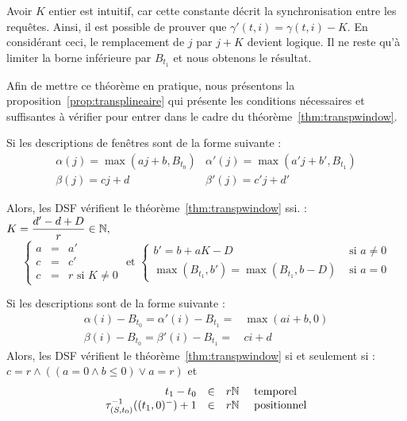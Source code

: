 Avoir $K$ entier est intuitif, car cette constante décrit la synchronisation entre les requêtes. Ainsi, il est possible de prouver que $\gamma'(t,i) = \gamma(t,i) - K$. En considérant ceci, le remplacement de $j$ par $j+K$ devient logique. Il ne reste qu'à limiter la borne inférieure par $B_{t_1}$ et nous obtenons le résultat.

Afin de mettre ce théorème en pratique, nous présentons la proposition~\ref{prop:transplineaire} qui présente les conditions nécessaires et suffisantes à vérifier pour entrer dans le cadre du théorème~\ref{thm:transpwindow}.
\begin{prop}\label{prop:transplineaire}
    Si les descriptions de fenêtres sont de la forme suivante :
$$\begin{array}{ll} \alpha(j) = \max(aj+b,B_{t_0}) & \alpha'(j) = \max(a'j+b',B_{t_1})\\ \beta(j) = cj+d & \beta'(j) = c'j+d' \end{array}$$

    Alors, les DSF vérifient le théorème~\ref{thm:transpwindow} ssi. :  $K=\dfrac{d'-d+D}r \in \mathbb{N},$
$$\left\{\begin{array}{rcl} a & = & a'\\ c & = & c'\\ c & = & r \textrm{\ si\ } K \neq 0 \end{array}\right.\textrm{ et }\begin{cases} b' = b+aK-D & \textrm{\ si\ } a \neq 0\\ \max(B_{t_1},b') = \max(B_{t_1}, b-D)& \textrm{\ si\ } a=0 \end{cases}$$
\end{prop}
\begin{coro}\label{coro:transplineaire}
    Si les descriptions sont de la forme suivante :
$$\begin{array}{ll} \alpha(i) - B_{t_0} = \alpha'(i)-B_{t_1} = & \max(ai+b,0)\\ \beta(i) - B_{t_0} = \beta'(i)-B_{t_1} = & ci+d \end{array}$$
    Alors, les DSF vérifient le théorème~\ref{thm:transpwindow} si et seulement si : $c = r \wedge ((a = 0 \wedge b\leq 0) \vee a = r)$ et
$$\begin{array}{rcl} t_1 - t_0 & \in & r\mathbb{N} \quad \textrm{\ temporel}\\ \tau_{(S,t_0)}^{-1} ((t_1,0)^-)+1 & \in & r\mathbb{N} \quad \textrm{\ positionnel} \end{array}$$
\end{coro}

